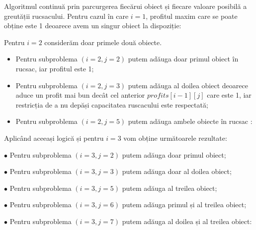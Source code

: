 \begin{sloppypar}

Algoritmul continuă prin parcurgerea fiecărui obiect și fiecare valoare posibilă a greutății rucsacului. Pentru cazul în care $i = 1$, profitul maxim care se poate obține este 1 deoarece avem un singur obiect la dispoziție: 


Pentru $i = 2$ considerăm doar primele două obiecte. \par
\begin{itemize}
\item Pentru subproblema $(i = 2, j = 2)$ putem adăuga doar primul obiect în rucsac, iar profitul este 1; 
\item Pentru subproblema $(i = 2, j = 3)$ putem adăuga al doilea obiect deoarece aduce un profit mai bun decât cel anterior $profits[i - 1][j]$ care este 1, iar restricția de a nu depăși capacitatea ruscacului este respectată; 
\item Pentru subproblema $(i = 2, j = 5)$ putem adăuga ambele obiecte în rucsac : 
\end{itemize}


Aplicând aceeași logică și pentru $i = 3$ vom obține următoarele rezultate: \par
$\bullet$ Pentru subproblema $(i = 3, j = 2)$ putem adăuga doar primul obiect; \par
$\bullet$ Pentru subproblema $(i = 3, j = 3)$ putem adăuga doar al doilea obiect; \par
$\bullet$ Pentru subproblema $(i = 3, j = 5)$ putem adăuga al treilea obiect; \par
$\bullet$ Pentru subproblema $(i = 3, j = 6)$ putem adăuga primul și al treilea obiect; \par
$\bullet$ Pentru subproblema $(i = 3, j = 7)$ putem adăuga al doilea și al treilea obiect: \par



\end{sloppypar}
